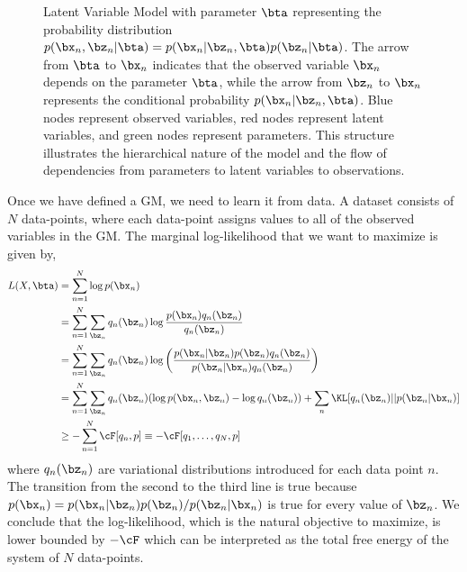\documentclass{lecture}
\begin{document}
\begin{figure}[ht]
	\centering
	\caption{Latent Variable Model with parameter $\bta$ representing the probability distribution $p(\bx_n,\bz_n|\bta)=p(\bx_n|\bz_n,\bta)p(\bz_n|\bta)$. The arrow from $\bta$ to $\bx_n$ indicates that the observed variable $\bx_n$ depends on the parameter $\bta$, while the arrow from $\bz_n$ to $\bx_n$ represents the conditional probability $p(\bx_n|\bz_n,\bta)$. Blue nodes represent observed variables, red nodes represent latent variables, and green nodes represent parameters. This structure illustrates the hierarchical nature of the model and the flow of dependencies from parameters to latent variables to observations.}
	\label{fig:lvm_with_param}
\end{figure}

Once we have defined a GM, we need to learn it from data. A dataset consists of $N$ data-points, where each data-point assigns values to all of the observed variables in the GM. The marginal log-likelihood that we want to maximize is given by,
\begin{align}
	L(X,\bta) &=\sum_{n=1}^N \log p(\bx_n)\\
	          &=\sum_{n=1}^N \sum_{\bz_n} q_n(\bz_n) \log \frac{p(\bx_n) q_n(\bz_n)}{q_n(\bz_n)}\\
	          &=\sum_{n=1}^N \sum_{\bz_n} q_n(\bz_n) \log \left( \frac{p(\bx_n|\bz_n)p(\bz_n) q_n(\bz_n)}{p(\bz_n|\bx_n) q_n(\bz_n)} \right)\\
	          &=\sum_{n=1}^N \sum_{\bz_n} q_n(\bz_n) (\log p(\bx_n,\bz_n) - \log q_n(\bz_n)) + \sum_n \KL[q_n(\bz_n)||p(\bz_n|\bx_n)]\\
	          &\geq -\sum_{n=1}^N \cF[q_n,p] \equiv -\cF[q_1,\ldots,q_N,p] \label{eqn:ELBO}
\end{align}
where $q_n(\bz_n)$ are variational distributions introduced for each data point $n$. The transition from the second to the third line is true because $p(\bx_n)=p(\bx_n|\bz_n)p(\bz_n)/p(\bz_n|\bx_n)$ is true for every value of $\bz_n$. We conclude that the log-likelihood, which is the natural objective to maximize, is lower bounded by $-\cF$ which can be interpreted as the total free energy of the system of $N$ data-points.
\end{document}
